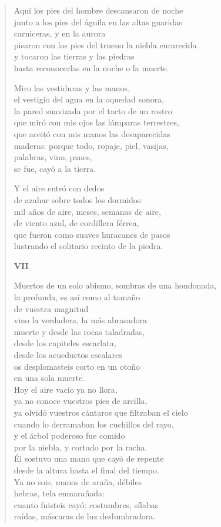 \documentclass[12pt]{article}
\begin{document}
\begin{verse}
Aquí los pies del hombre descansaron de noche\\
junto a los pies del águila en las altas guaridas\\
carniceras, y en la aurora\\
pisaron con los pies del trueno la niebla enrarecida\\
y tocaron las tierras y las piedras\\
hasta reconocerlas en la noche o la muerte.  

Miro las vestiduras y las manos,\\
el vestigio del agua en la oquedad sonora,\\
la pared suavizada por el tacto de un rostro\\
que miró con mis ojos las lámparas terrestres,\\
que aceitó con mis manos las desaparecidas\\
maderas: porque todo, ropaje, piel, vasijas,\\
palabras, vino, panes,\\
se fue, cayó a la tierra.  

Y el aire entró con dedos\\
de azahar sobre todos los dormidos:\\
mil años de aire, meses, semanas de aire,\\
de viento azul, de cordillera férrea,\\
que fueron como suaves huracanes de pasos\\
lustrando el solitario recinto de la piedra.  

{\bfseries\scshape {VII}}

Muertos de un solo abismo, sombras de una hondonada,\\
la profunda, es así como al tamaño\\
de vuestra magnitud\\
vino la verdadera, la más abrasadora\\
muerte y desde las rocas taladradas,\\
desde los capiteles escarlata,\\
desde los acueductos escalares\\
os desplomasteis corto en un otoño\\
en una sola muerte.\\
Hoy el aire vacío ya no llora,\\
ya no conoce vuestros pies de arcilla,\\
ya olvidó vuestros cántaros que filtraban el cielo\\
cuando lo derramaban los cuchillos del rayo,\\
y el árbol poderoso fue comido\\
por la niebla, y cortado por la racha.\\
Él sostuvo una mano que cayó de repente\\
desde la altura hasta el final del tiempo.\\
Ya no sois, manos de araña, débiles\\
hebras, tela enmarañada:\\
cuanto fuisteis cayó: costumbres, sílabas\\
raídas, máscaras de luz deslumbradora.  


\end{verse}
\end{document}
